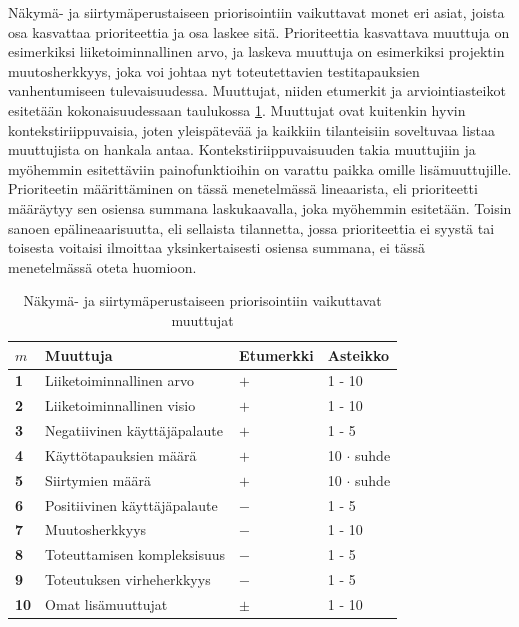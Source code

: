   Näkymä- ja siirtymäperustaiseen priorisointiin vaikuttavat monet eri asiat, joista osa kasvattaa prioriteettia ja osa laskee sitä.
  Prioriteettia kasvattava muuttuja on esimerkiksi liiketoiminnallinen arvo, ja laskeva muuttuja on esimerkiksi projektin muutosherkkyys, joka voi johtaa nyt toteutettavien testitapauksien vanhentumiseen tulevaisuudessa.
  Muuttujat, niiden etumerkit ja arviointiasteikot esitetään kokonaisuudessaan taulukossa \ref{tab:priorisointiin_vaikuttavat_muuttujat}.
  Muuttujat ovat kuitenkin hyvin kontekstiriippuvaisia, joten yleispätevää ja kaikkiin tilanteisiin soveltuvaa listaa muuttujista on hankala antaa.
  Kontekstiriippuvaisuuden takia muuttujiin ja myöhemmin esitettäviin painofunktioihin on varattu paikka omille lisämuuttujille.
  Prioriteetin määrittäminen on tässä menetelmässä lineaarista, eli prioriteetti määräytyy sen osiensa summana laskukaavalla, joka myöhemmin esitetään.
  Toisin sanoen epälineaarisuutta, eli sellaista tilannetta, jossa prioriteettia ei syystä tai toisesta voitaisi ilmoittaa yksinkertaisesti osiensa summana, ei tässä menetelmässä oteta huomioon.

  \begin{table}[H]
    \caption{Näkymä- ja siirtymäperustaiseen priorisointiin vaikuttavat muuttujat}
    \label{tab:priorisointiin_vaikuttavat_muuttujat}
    \centering
    \begin{tabular}{l|l|l|l} \hline
    \(m\) & \textbf{Muuttuja} & \textbf{Etumerkki} & \textbf{Asteikko} \\ \hline
    \textbf{1} & Liiketoiminnallinen arvo & \(+\) & 1 - 10 \\
    \textbf{2} & Liiketoiminnallinen visio & \(+\) & 1 - 10 \\
    \textbf{3} & Negatiivinen käyttäjäpalaute & \(+\) & 1 - 5 \\
    \textbf{4} & Käyttötapauksien määrä & \(+\) & 10 \(\cdot\) suhde  \\
    \textbf{5} & Siirtymien määrä & \(+\) & 10 \(\cdot\) suhde  \\
    \textbf{6} & Positiivinen käyttäjäpalaute & \(-\) & 1 - 5  \\
    \textbf{7} & Muutosherkkyys & \(-\) & 1 - 10  \\
    \textbf{8} & Toteuttamisen kompleksisuus & \(-\) & 1 - 5  \\
    \textbf{9} & Toteutuksen virheherkkyys & \(-\) & 1 - 5  \\
    \textbf{10} & Omat lisämuuttujat & \(\pm\) & 1 - 10 \\ \hline
    \end{tabular}
  \end{table}

